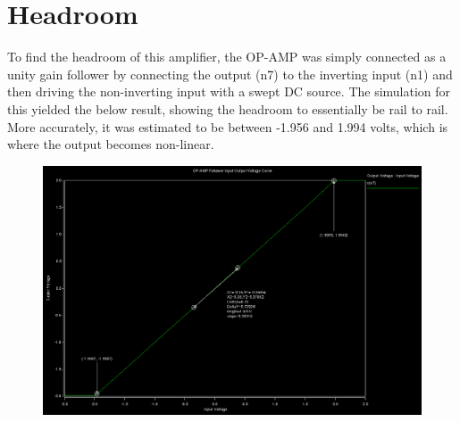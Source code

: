 \documentclass[12pt]{article}
\begin{document}
\section{Headroom}
To find the headroom of this amplifier, the OP-AMP was simply connected as a unity gain follower by connecting the output (n7) to the inverting input (n1) and then driving the non-inverting input with a swept DC source. The simulation for this yielded the below result, showing the headroom to essentially be rail to rail. More accurately, it was estimated to be between -1.956 and 1.994 volts, which is where the output becomes non-linear.
\FloatBarrier
\begin{figure}[h!]
\begin{center}
 \includegraphics[scale=0.3]{./followerr.png}
\end{center}
\end{figure}
\FloatBarrier
\end{document}
